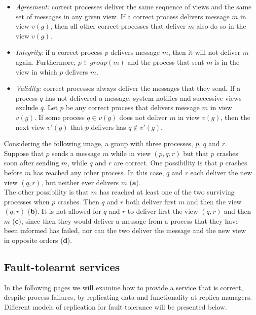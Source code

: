 \begin{itemize}
	\item \textit{Agreement:} correct processes deliver the same sequence of views and the same set of messages in any given view. If a correct process delivers message $m$ in view $v(g)$, then all other correct processes that deliver $m$ also do so in the view $v(g)$.
	\item \textit{Integrity:} if a correct process $p$ delivers message $m$, then it will not deliver $m$ again.
	Furthermore, $p \in group(m)$ and the process that sent $m$ is in the view in which $p$
	delivers $m$.
	\item \textit{Validity:} correct processes always deliver the messages that they send. If a process $q$ has not delivered a message, system notifies and successive views exclude $q$. Let $p$ be any correct process
	that delivers message $m$ in view $v(g)$. If some process $q \in v(g)$ does not deliver $m$ in
	view $v(g)$, then the next view $v'(g)$ that $p$ delivers has $q \notin v'(g)$.
\end{itemize}
Considering the following image, a group with three processes, $p$, $q$ and $r$. Suppose that $p$ sends a message $m$ while in view $(p, q, r)$ but that $p$ crashes soon after sending $m$, while $q$ and $r$ are correct. One possibility is that $p$ crashes before $m$ has reached any other process. In this case, $q$ and $r$ each deliver the new view $(q, r)$, but neither ever delivers $m$ (\textbf{a}).\\
The other possibility is that $m$ has reached at least one of the two surviving
processes when $p$ crashes. Then $q$ and $r$ both deliver first $m$ and then the view $(q, r)$ (\textbf{b}). It is not allowed for $q$ and $r$ to deliver first the view $(q, r)$ and then $m$ (\textbf{c}), since then they would deliver a message from a process that they have been informed has failed, nor can the two deliver the message and the new view in opposite orders (\textbf{d}).

\subsection{Fault-tolearnt services}
In the following pages we will examine how to provide a service that is correct, despite process failures, by replicating data and functionality at replica managers. Different models of replication for fault tolerance will be presented below.
